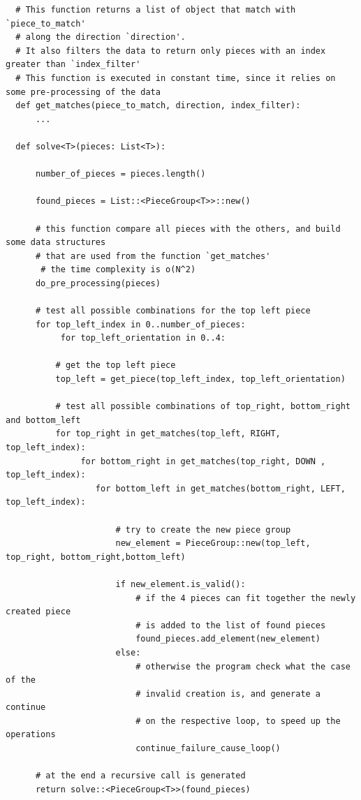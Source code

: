 \documentclass{article}
\begin{document}
\begin{minipage}{\textwidth}
\begin{lstlisting}
  # This function returns a list of object that match with `piece_to_match'
  # along the direction `direction'.
  # It also filters the data to return only pieces with an index greater than `index_filter'
  # This function is executed in constant time, since it relies on some pre-processing of the data
  def get_matches(piece_to_match, direction, index_filter):
      ...

  def solve<T>(pieces: List<T>):

      number_of_pieces = pieces.length()

      found_pieces = List::<PieceGroup<T>>::new()

      # this function compare all pieces with the others, and build some data structures
      # that are used from the function `get_matches'
	   # the time complexity is o(N^2)
      do_pre_processing(pieces)

      # test all possible combinations for the top left piece
      for top_left_index in 0..number_of_pieces:
	       for top_left_orientation in 0..4:

          # get the top left piece
          top_left = get_piece(top_left_index, top_left_orientation)

          # test all possible combinations of top_right, bottom_right and bottom_left
          for top_right in get_matches(top_left, RIGHT, top_left_index):
	           for bottom_right in get_matches(top_right, DOWN , top_left_index):
                  for bottom_left in get_matches(bottom_right, LEFT, top_left_index):

                      # try to create the new piece group
                      new_element = PieceGroup::new(top_left, top_right, bottom_right,bottom_left)

                      if new_element.is_valid():
                          # if the 4 pieces can fit together the newly created piece
                          # is added to the list of found pieces
                          found_pieces.add_element(new_element)
                      else:
                          # otherwise the program check what the case of the 
                          # invalid creation is, and generate a continue
                          # on the respective loop, to speed up the operations
                          continue_failure_cause_loop()

      # at the end a recursive call is generated 
      return solve::<PieceGroup<T>>(found_pieces)

\end{lstlisting}
\end{minipage}
\end{document}
